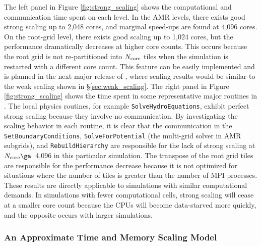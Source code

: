 
The left panel in Figure \ref{fig:strong_scaling} shows the
computational and communication time spent on each level.  In the AMR
levels, there exists good strong scaling up to 2,048 cores, and
marginal speed-ups are found at 4,096 cores.  On the root-grid level,
there exists good scaling up to 1,024 cores, but the performance
dramatically decreases at higher core counts.  This occurs because the
root grid is not re-partitioned into $N_{\rm core}$ tiles when the
simulation is restarted with a different core count.  This feature can
be easily implemented and is planned in the next major release of
\enzo, where scaling results would be similar to the weak scaling
shown in \S\ref{sec:weak_scaling}.  The right panel in Figure
\ref{fig:strong_scaling} shows the time spent in some representative
major routines in \enzo.  The local physics routines, for example
\texttt{SolveHydroEquations}, exhibit perfect strong scaling because
they involve no communication.  By investigating the scaling behavior
in each routine, it is clear that the communication in the
\texttt{SetBoundaryConditions}, \texttt{SolveForPotential} (the
multi-grid solver in AMR subgrids), and \texttt{RebuildHierarchy} are
responsible for the lack of strong scaling at $N_{\rm core} \ga$~4,096
in this particular simulation.  The transpose of the root grid tiles
are responsible for the performance decrease because it is not
optimized for situations where the number of tiles is greater than the
number of MPI processes.  These results are directly applicable to
simulations with similar computational demands.  In simulations with
fewer computational cells, strong scaling will cease at a smaller core
count because the CPUs will become data-starved more quickly, and the
opposite occurs with larger simulations.


\subsubsection{An Approximate Time and Memory Scaling Model}

